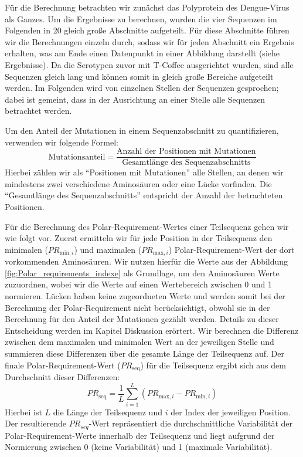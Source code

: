 \documentclass[german,version-2022-01]{uzl-thesis}
\begin{document}
F\"ur die Berechnung betrachten wir zun\"achst das Polyprotein des Dengue-Virus als Ganzes. Um die Ergebnisse zu berechnen, wurden die vier Sequenzen im Folgenden in 20 gleich gro\ss{}e Abschnitte aufgeteilt. F\"ur diese Abschnitte f\"uhren wir die Berechnungen einzeln durch, sodass wir f\"ur jeden Abschnitt ein Ergebnis erhalten, was am Ende einen Datenpunkt in einer Abbildung darstellt (siehe Ergebnisse). Da die Serotypen zuvor mit T-Coffee ausgerichtet wurden, sind alle Sequenzen gleich lang und k\"onnen somit in gleich gro\ss{}e Bereiche aufgeteilt werden. Im Folgenden wird von einzelnen Stellen der Sequenzen gesprochen; dabei ist gemeint, dass in der Ausrichtung an einer Stelle alle Sequenzen betrachtet werden.

Um den Anteil der Mutationen in einem Sequenzabschnitt zu quantifizieren, verwenden wir folgende Formel: 
\begin{equation}
    \text{Mutationsanteil} = \frac{\text{Anzahl der Positionen mit Mutationen}}{\text{Gesamtl\"ange des Sequenzabschnitts}} \label{eq:Anteil_an_Mutationen}
\end{equation}
Hierbei z\"ahlen wir als "`Positionen mit Mutationen"' alle Stellen, an denen wir mindestens zwei verschiedene Aminos\"auren oder eine L\"ucke vorfinden. Die "`Gesamtl\"ange des Sequenzabschnitts"' entspricht der Anzahl der betrachteten Positionen.

F\"ur die Berechnung des Polar-Requirement-Wertes einer Teilsequenz gehen wir wie folgt vor. Zuerst ermitteln wir f\"ur jede Position in der Teilsequenz den minimalen ($PR_{\text{min},i}$) und maximalen ($PR_{\text{max},i}$) Polar-Requirement-Wert der dort vorkommenden Aminos\"auren. Wir nutzen hierf\"ur die Werte aus der Abbildung \ref{fig:Polar_requirements_indexe} als Grundlage, um den Aminos\"auren Werte zuzuordnen, wobei wir die Werte auf einen Wertebereich zwischen 0 und 1 normieren. L\"ucken haben keine zugeordneten Werte und werden somit bei der Berechnung der Polar-Requirement nicht ber\"ucksichtigt, obwohl sie in der Berechnung f\"ur den Anteil der Mutationen gez\"ahlt werden. Details zu dieser Entscheidung werden im Kapitel Diskussion er\"ortert. Wir berechnen die Differenz zwischen dem maximalen und minimalen Wert an der jeweiligen Stelle und summieren diese Differenzen \"uber die gesamte L\"ange der Teilsequenz auf. Der finale Polar-Requirement-Wert ($PR_{\text{seq}}$) f\"ur die Teilsequenz ergibt sich aus dem Durchschnitt dieser Differenzen:
\begin{equation}
    PR_{\text{seq}} = \frac{1}{L} \sum_{i=1}^{L} (PR_{\text{max},i} - PR_{\text{min},i})
    \label{eq:polar_requirements}
\end{equation}
Hierbei ist $L$ die L\"ange der Teilsequenz und $i$ der Index der jeweiligen Position. Der resultierende $PR_{seq}$-Wert repr\"asentiert die durchschnittliche Variabilit\"at der Polar-Requirement-Werte innerhalb der Teilsequenz und liegt aufgrund der Normierung zwischen 0 (keine Variabilit\"at) und 1 (maximale Variabilit\"at).
\end{document}
